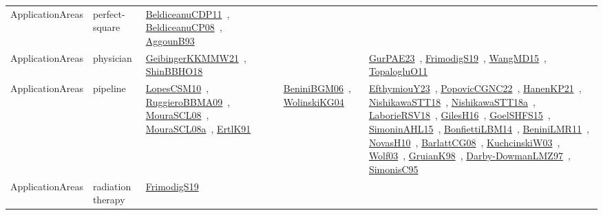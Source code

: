 {\begin{longtable}{lp{3cm}>{\raggedright\arraybackslash}p{6cm}>{\raggedright\arraybackslash}p{6cm}>{\raggedright\arraybackslash}p{8cm}}
ApplicationAreas & perfect-square & \href{articles/BeldiceanuCDP11.pdf}{BeldiceanuCDP11}~\cite{BeldiceanuCDP11}, \href{papers/BeldiceanuCP08.pdf}{BeldiceanuCP08}~\cite{BeldiceanuCP08}, \href{articles/AggounB93.pdf}{AggounB93}~\cite{AggounB93} &  & \\
ApplicationAreas & physician & \href{papers/GeibingerKKMMW21.pdf}{GeibingerKKMMW21}~\cite{GeibingerKKMMW21}, \href{articles/ShinBBHO18.pdf}{ShinBBHO18}~\cite{ShinBBHO18} &  & \href{articles/GurPAE23.pdf}{GurPAE23}~\cite{GurPAE23}, \href{papers/FrimodigS19.pdf}{FrimodigS19}~\cite{FrimodigS19}, \href{articles/WangMD15.pdf}{WangMD15}~\cite{WangMD15}, \href{articles/TopalogluO11.pdf}{TopalogluO11}~\cite{TopalogluO11}\\
ApplicationAreas & pipeline & \href{articles/LopesCSM10.pdf}{LopesCSM10}~\cite{LopesCSM10}, \href{articles/RuggieroBBMA09.pdf}{RuggieroBBMA09}~\cite{RuggieroBBMA09}, \href{papers/MouraSCL08.pdf}{MouraSCL08}~\cite{MouraSCL08}, \href{papers/MouraSCL08a.pdf}{MouraSCL08a}~\cite{MouraSCL08a}, \href{papers/ErtlK91.pdf}{ErtlK91}~\cite{ErtlK91} & \href{papers/BeniniBGM06.pdf}{BeniniBGM06}~\cite{BeniniBGM06}, \href{papers/WolinskiKG04.pdf}{WolinskiKG04}~\cite{WolinskiKG04} & \href{papers/EfthymiouY23.pdf}{EfthymiouY23}~\cite{EfthymiouY23}, \href{papers/PopovicCGNC22.pdf}{PopovicCGNC22}~\cite{PopovicCGNC22}, \href{papers/HanenKP21.pdf}{HanenKP21}~\cite{HanenKP21}, \href{papers/NishikawaSTT18.pdf}{NishikawaSTT18}~\cite{NishikawaSTT18}, \href{papers/NishikawaSTT18a.pdf}{NishikawaSTT18a}~\cite{NishikawaSTT18a}, \href{articles/LaborieRSV18.pdf}{LaborieRSV18}~\cite{LaborieRSV18}, \href{papers/GilesH16.pdf}{GilesH16}~\cite{GilesH16}, \href{articles/GoelSHFS15.pdf}{GoelSHFS15}~\cite{GoelSHFS15}, \href{articles/SimoninAHL15.pdf}{SimoninAHL15}~\cite{SimoninAHL15}, \href{articles/BonfiettiLBM14.pdf}{BonfiettiLBM14}~\cite{BonfiettiLBM14}, \href{articles/BeniniLMR11.pdf}{BeniniLMR11}~\cite{BeniniLMR11}, \href{articles/NovasH10.pdf}{NovasH10}~\cite{NovasH10}, \href{papers/BarlattCG08.pdf}{BarlattCG08}~\cite{BarlattCG08}, \href{articles/KuchcinskiW03.pdf}{KuchcinskiW03}~\cite{KuchcinskiW03}, \href{papers/Wolf03.pdf}{Wolf03}~\cite{Wolf03}, \href{papers/GruianK98.pdf}{GruianK98}~\cite{GruianK98}, \href{articles/Darby-DowmanLMZ97.pdf}{Darby-DowmanLMZ97}~\cite{Darby-DowmanLMZ97}, \href{papers/SimonisC95.pdf}{SimonisC95}~\cite{SimonisC95}\\
ApplicationAreas & radiation therapy & \href{papers/FrimodigS19.pdf}{FrimodigS19}~\cite{FrimodigS19} &  & \\

\end{longtable}}

